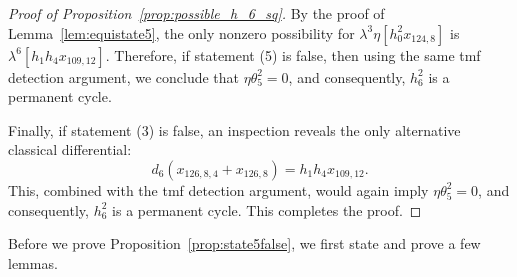\documentclass{amsart}
\numberwithin{equation}{section}
\begin{document}
\begin{proof}[Proof of Proposition~\ref{prop:possible_h_6_sq}]
By the proof of Lemma~\ref{lem:equistate5}, the only nonzero possibility for $\lambda^3 \eta [h_0^2x_{124,8}]$ is $\lambda^6 [h_1h_4x_{109,12}]$. Therefore, if statement (5) is false, then using the same tmf detection argument, we conclude that $\eta \theta_5^2 = 0$, and consequently, $h_6^2$ is a permanent cycle.

Finally, if statement (3) is false, an inspection reveals the only alternative classical differential:
$$d_6(x_{126,8,4} + x_{126,8}) = h_1h_4x_{109,12}.$$
This, combined with the tmf detection argument, would again imply $\eta \theta_5^2 = 0$, and consequently, $h_6^2$ is a permanent cycle. This completes the proof.
\end{proof}





Before we prove Proposition~\ref{prop:state5false}, we first state and prove a few lemmas.
\end{document}
